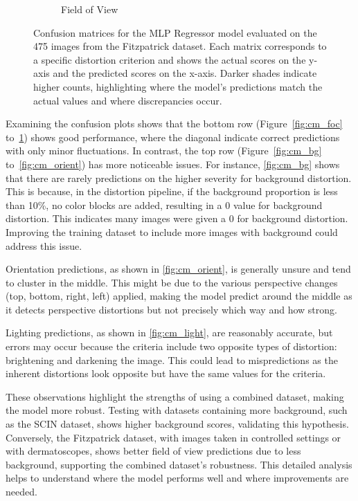 \begin{figure}[ht]
\begin{subfigure}[b]{0.24\textwidth}
        \caption{Field of View}
        \label{fig:cm_fov}
    \end{subfigure}
    \caption{Confusion matrices for the MLP Regressor model evaluated on the 475 images from the Fitzpatrick dataset. Each matrix corresponds to a specific distortion criterion and shows the actual scores on the y-axis and the predicted scores on the x-axis. Darker shades indicate higher counts, highlighting where the model's predictions match the actual values and where discrepancies occur.}
    \label{fig:confusion_matrices}
\end{figure}
\vspace{\baselineskip}
\noindent
Examining the confusion plots shows that the bottom row (Figure~\ref{fig:cm_foc} to~\ref{fig:cm_fov}) shows good performance, where the diagonal indicate correct predictions with only minor fluctuations. In contrast, the top row (Figure~\ref{fig:cm_bg} to~\ref{fig:cm_orient}) has more noticeable issues. For instance, \autoref{fig:cm_bg} shows that there are rarely predictions on the higher severity for background distortion. This is because, in the distortion pipeline, if the background proportion is less than 10\%, no color blocks are added, resulting in a 0 value for background distortion. This indicates many images were given a 0 for background distortion. Improving the training dataset to include more images with background could address this issue. \par
\vspace{\baselineskip}
\noindent
Orientation predictions, as shown in \autoref{fig:cm_orient}, is generally unsure and tend to cluster in the middle. This might be due to the various perspective changes (top, bottom, right, left) applied, making the model predict around the middle as it detects perspective distortions but not precisely which way and how strong. \par
\vspace{\baselineskip}
\noindent
Lighting predictions, as shown in \autoref{fig:cm_light}, are reasonably accurate, but errors may occur because the criteria include two opposite types of distortion: brightening and darkening the image. This could lead to mispredictions as the inherent distortions look opposite but have the same values for the criteria. \par
\vspace{\baselineskip}
\noindent
These observations highlight the strengths of using a combined dataset, making the model more robust. Testing with datasets containing more background, such as the SCIN dataset, shows higher background scores, validating this hypothesis. Conversely, the Fitzpatrick dataset, with images taken in controlled settings or with dermatoscopes, shows better field of view predictions due to less background, supporting the combined dataset's robustness. This detailed analysis helps to understand where the model performs well and where improvements are needed. \par
